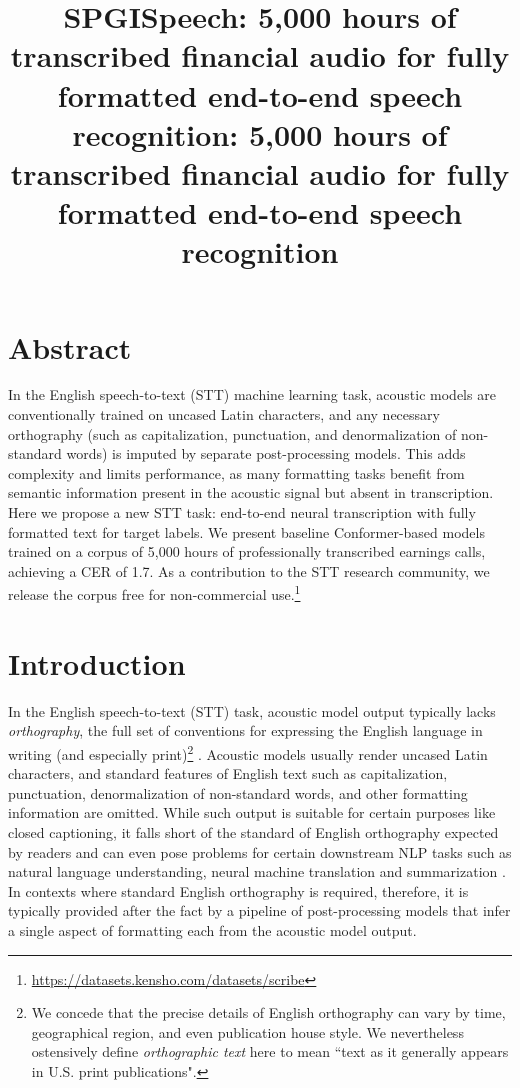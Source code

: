 \documentclass{article}
\title{SPGISpeech: 5,000 hours of transcribed financial audio for fully formatted end-to-end speech recognition}
\title{\corpus{}: 5,000 hours of transcribed financial audio for fully formatted end-to-end speech recognition}
\begin{document}
\maketitle




\section{Abstract} In the English speech-to-text (STT) machine
learning task, acoustic models are conventionally trained on uncased
Latin characters, and any necessary orthography (such as
capitalization, punctuation, and denormalization of non-standard
words) is imputed by separate post-processing models.
This adds complexity and limits performance, as many formatting tasks
benefit from semantic information present in the acoustic signal but
absent in transcription.  Here we propose a new STT task: end-to-end
neural transcription with fully formatted text for target labels.  We
present baseline Conformer-based models trained on a corpus of 5,000 hours of
professionally transcribed earnings calls, achieving a CER of 1.7.
As a contribution to the STT research community, we release the corpus free for non-commercial use.\footnote{\url{https://datasets.kensho.com/datasets/scribe}}

\section{Introduction}

In the English speech-to-text (STT) task, acoustic model output typically lacks \textit{orthography}, the full set of conventions for expressing the English language in writing (and especially print)\footnote{We concede that the precise details of English orthography can vary by time, geographical region, and even publication house style.  We nevertheless ostensively define \textit{orthographic text} here to mean ``text as it generally appears in U.S. print publications".} \cite{albrow72}. Acoustic models usually render uncased Latin characters, and standard features of English text such as capitalization, punctuation, denormalization of non-standard words, and other formatting information are omitted.  While such output is suitable for certain purposes like
closed captioning, it falls short of the standard of English
orthography expected by readers and can even pose problems for certain
downstream NLP tasks such as natural language understanding, neural
machine translation and summarization \cite{ravichander21, peitz11}.  In contexts where standard
English orthography is required, therefore, it is typically provided
after the fact by a pipeline of post-processing models that infer a
single aspect of formatting each from the acoustic model output.
\end{document}
